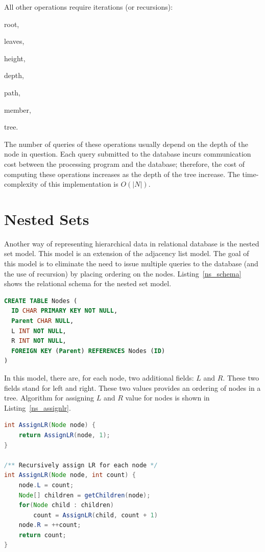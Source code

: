 All other operations require iterations (or recursions): \begin{inparaenum}[\itshape 1)]
\item root,
\item leaves,
\item height,
\item depth,
\item path,
\item member,
\item tree.
\end{inparaenum}
The number of queries of these operations usually depend on the depth of the node in question. Each query submitted to the database incurs communication cost between the processing program and the database; therefore, the cost of computing these operations increases as the depth of the tree increase. The time-complexity of this implementation is $O(|N|)$.


\section{Nested Sets}\label{sec-nested-set}

Another way of representing hierarchical data in relational database is the nested set model\cite{journals/trj/Kamfonas92}. This model is an extension of the adjacency list model. The goal of this model is to eliminate the need to issue multiple queries to the database (and the use of recursion) by placing ordering on the nodes. Listing~\ref{ns_schema} shows the relational schema for the nested set model.

\begin{lstlisting}[language=sql,caption={Nodes table for nested set model},label=ns_schema, float]
CREATE TABLE Nodes (
  ID CHAR PRIMARY KEY NOT NULL,
  Parent CHAR NULL,
  L INT NOT NULL,
  R INT NOT NULL,
  FOREIGN KEY (Parent) REFERENCES Nodes (ID)
)
\end{lstlisting}	

In this model, there are, for each node, two additional fields: $L$ and $R$. These two fields stand for left and right. These two values provides an ordering of nodes in a tree. Algorithm for assigning $L$ and $R$ value for nodes is shown in Listing~\ref{ns_assignlr}.

\begin{lstlisting}[language=java,caption={Algorithm for Left-Right value assignment for nested set model},label=ns_assignlr, float]
int AssignLR(Node node) {
    return AssignLR(node, 1);
}

/** Recursively assign LR for each node */
int AssignLR(Node node, int count) {
	node.L = count;
	Node[] children = getChildren(node);
	for(Node child : children)
		count = AssignLR(child, count + 1)
	node.R = ++count;
	return count;
}
\end{lstlisting}

